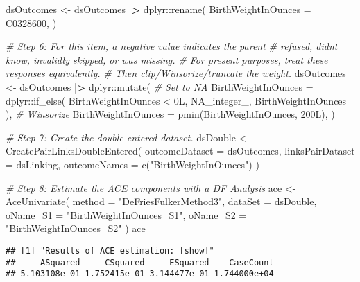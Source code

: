 \documentclass[smallextended]{svjour3}       %
\newenvironment{Shaded}{\begin{snugshade}}{\end{snugshade}}
\newcommand{\AttributeTok}[1]{\textcolor[rgb]{0.77,0.63,0.00}{#1}}
\newcommand{\CommentTok}[1]{\textcolor[rgb]{0.56,0.35,0.01}{\textit{#1}}}
\newcommand{\ConstantTok}[1]{\textcolor[rgb]{0.00,0.00,0.00}{#1}}
\newcommand{\ErrorTok}[1]{\textcolor[rgb]{0.64,0.00,0.00}{\textbf{#1}}}
\newcommand{\FunctionTok}[1]{\textcolor[rgb]{0.00,0.00,0.00}{#1}}
\newcommand{\NormalTok}[1]{#1}
\newcommand{\OtherTok}[1]{\textcolor[rgb]{0.56,0.35,0.01}{#1}}
\newcommand{\SpecialCharTok}[1]{\textcolor[rgb]{0.00,0.00,0.00}{#1}}
\newcommand{\StringTok}[1]{\textcolor[rgb]{0.31,0.60,0.02}{#1}}
\begin{document}
\begin{Shaded}
\begin{Highlighting}[]
\NormalTok{dsOutcomes }\OtherTok{\textless{}{-}}
\NormalTok{  dsOutcomes }\SpecialCharTok{|}\ErrorTok{\textgreater{}}
\NormalTok{  dplyr}\SpecialCharTok{::}\FunctionTok{rename}\NormalTok{(}
    \AttributeTok{BirthWeightInOunces =}\NormalTok{ C0328600,}
\NormalTok{  )}

\CommentTok{\# Step 6: For this item, a negative value indicates the parent}
\CommentTok{\#   refused, didn\textquotesingle{}t know, invalidly skipped, or was missing.}
\CommentTok{\#   For present purposes, treat these responses equivalently.}
\CommentTok{\#   Then clip/Winsorize/truncate the weight.}
\NormalTok{dsOutcomes }\OtherTok{\textless{}{-}}
\NormalTok{  dsOutcomes }\SpecialCharTok{|}\ErrorTok{\textgreater{}}
\NormalTok{  dplyr}\SpecialCharTok{::}\FunctionTok{mutate}\NormalTok{(}
    \CommentTok{\# Set to NA}
    \AttributeTok{BirthWeightInOunces =}\NormalTok{ dplyr}\SpecialCharTok{::}\FunctionTok{if\_else}\NormalTok{(}
\NormalTok{      BirthWeightInOunces }\SpecialCharTok{\textless{}}\NormalTok{ 0L,}
      \ConstantTok{NA\_integer\_}\NormalTok{,}
\NormalTok{      BirthWeightInOunces}
\NormalTok{    ),}
    \CommentTok{\# Winsorize}
    \AttributeTok{BirthWeightInOunces =} \FunctionTok{pmin}\NormalTok{(BirthWeightInOunces, 200L),}
\NormalTok{  )}


\CommentTok{\# Step 7: Create the double entered dataset.}
\NormalTok{dsDouble }\OtherTok{\textless{}{-}}
  \FunctionTok{CreatePairLinksDoubleEntered}\NormalTok{(}
    \AttributeTok{outcomeDataset   =}\NormalTok{ dsOutcomes,}
    \AttributeTok{linksPairDataset =}\NormalTok{ dsLinking,}
    \AttributeTok{outcomeNames     =} \FunctionTok{c}\NormalTok{(}\StringTok{"BirthWeightInOunces"}\NormalTok{)}
\NormalTok{  )}

\CommentTok{\# Step 8: Estimate the ACE components with a DF Analysis}
\NormalTok{ace }\OtherTok{\textless{}{-}}
  \FunctionTok{AceUnivariate}\NormalTok{(}
    \AttributeTok{method   =} \StringTok{"DeFriesFulkerMethod3"}\NormalTok{,}
    \AttributeTok{dataSet  =}\NormalTok{ dsDouble,}
    \AttributeTok{oName\_S1 =} \StringTok{"BirthWeightInOunces\_S1"}\NormalTok{,}
    \AttributeTok{oName\_S2 =} \StringTok{"BirthWeightInOunces\_S2"}
\NormalTok{  )}
\NormalTok{ace}
\end{Highlighting}
\end{Shaded}

\begin{verbatim}
## [1] "Results of ACE estimation: [show]"
##     ASquared     CSquared     ESquared    CaseCount 
## 5.103108e-01 1.752415e-01 3.144477e-01 1.744000e+04
\end{verbatim}
\end{document}
